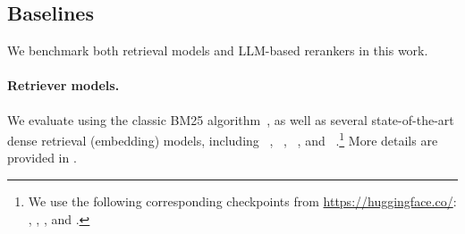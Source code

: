 \subsection{Baselines} We benchmark both retrieval models and LLM-based rerankers in this work. 

\paragraph{Retriever models.} We evaluate using the classic BM25 algorithm~\citep{bm25}, as well as several state-of-the-art dense retrieval (embedding) models,
including \gtr{}~\citep{ni-etal-2022-large},
\instructor{}~\citep{su-etal-2023-one},
\efive{}~\citep{Wang2022TextEB},
and \grit{}~\citep{muennighoff2024generative}.\footnote{We use the following corresponding checkpoints from \url{https://huggingface.co/}:
\gtrfull{}, \instructorfull{}, \efivefull{}, and \gritfull{}.}
More details are provided in .


